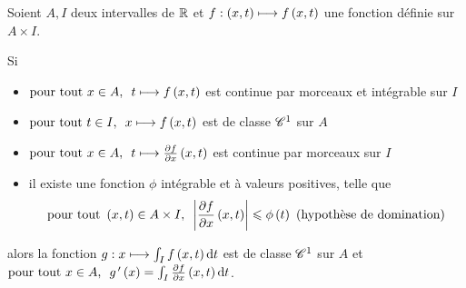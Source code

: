 \begin{theo}
Soient \(A,I\) deux intervalles de \(\mathbb{R}\) et \(f:\left(x,t\right)\longmapsto f\left(x,t\right)\) une fonction définie sur \(A\times I\).

Si

\begin{itemize}
    \item \(\quantifs{\tpt x\in A}t\mapsto f\paren{x,t}\) est continue par morceaux et intégrable sur \(I\) \\
    \item \(\quantifs{\tpt t\in I}x\mapsto f\paren{x,t}\) est de classe \(\mathscr{C}^{1}\) sur \(A\) \\
    \item \(\quantifs{\tpt x\in A}t\mapsto\pdv{f}{x}\paren{x,t}\) est continue par morceaux sur \(I\) \\
    \item il existe une fonction \(\phi\) intégrable et à valeurs positives, telle que \[\quantifs{\tpt\paren{x,t}\in A\times I}\abs{\pdv{f}{x}\paren{x,t}}\leq\phi\paren{t}\text{ (hypothèse de domination)}\]
\end{itemize}

alors la fonction \(g:x\mapsto\int_If\paren{x,t}\odif{t}\) est de classe \(\mathscr{C}^{1}\) sur \(A\) et \(\quantifs{\tpt x\in A}g\prim\paren{x}=\int_I\pdv{f}{x}\paren{x,t}\odif{t}\).
\end{theo}

